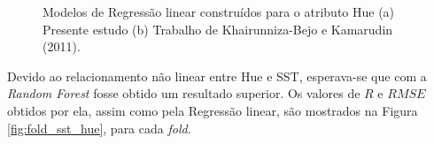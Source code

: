 \begin{figure}[H]
\centering
    \caption{\label{fig:comp_hue} Modelos de Regressão linear construídos para o atributo Hue (a) Presente estudo (b) Trabalho de Khairunniza-Bejo e Kamarudin (2011).}
\end{figure}

Devido ao relacionamento não linear entre Hue e SST, esperava-se que com a \textit{Random Forest} fosse obtido um resultado superior. Os valores de $R$ e $RMSE$ obtidos por ela, assim como pela Regressão linear, são mostrados na Figura \ref{fig:fold_sst_hue}, para cada \textit{fold}.

